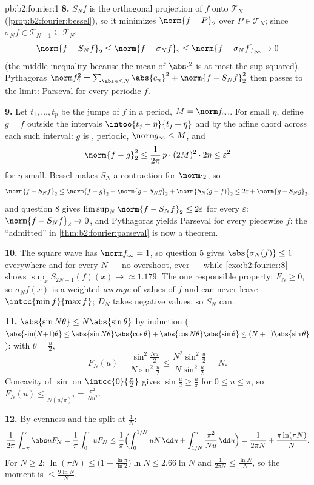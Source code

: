 \begin{solution}{pb:b2:fourier:1}
\textbf{8.} $S_Nf$ is the orthogonal projection of $f$ onto
$\mathcal T_N$ (\cref{prop:b2:fourier:bessel}), so it minimizes
$\norm{f - P}_2$ over $P \in \mathcal T_N$; since $\sigma_Nf
\in \mathcal T_{N-1} \subseteq \mathcal T_N$:
\[
\norm{f - S_Nf}_2 \leq \norm{f - \sigma_Nf}_2
\leq \norm{f - \sigma_Nf}_\infty \to 0
\]
(the middle inequality because the mean of $\abs\cdot^2$ is at
most the sup squared). Pythagoras $\norm f_2^2 = \sum_{\abs
n\leq N}\abs{c_n}^2 + \norm{f - S_Nf}_2^2$ then passes to the
limit: Parseval for every  periodic $f$.

\textbf{9.} Let $t_1, \dots, t_p$ be the jumps of $f$ in a
period, $M = \norm f_\infty$. For small $\eta$, define $g = f$
outside the intervals $\intoo{t_j - \eta}{t_j + \eta}$ and by
the affine chord across each such interval: $g$ is ,
periodic, $\norm g_\infty \leq M$, and
\[
\norm{f - g}_2^2 \leq \frac{1}{2\pi}\,p\cdot(2M)^2\cdot2\eta
\leq \varepsilon^2
\]
for $\eta$ small. Bessel makes $S_N$ a contraction for
$\norm\cdot_2$, so
\[
\norm{f - S_Nf}_2
\leq \norm{f - g}_2 + \norm{g - S_Ng}_2 + \norm{S_N(g -
f)}_2
\leq 2\varepsilon + \norm{g - S_Ng}_2 ,
\]
and question 8 gives $\limsup_N\norm{f - S_Nf}_2 \leq
2\varepsilon$ for every $\varepsilon$: $\norm{f - S_Nf}_2 \to
0$, and Pythagoras yields Parseval for every piecewise
 $f$: the ``admitted'' in
\cref{thm:b2:fourier:parseval} is now a theorem.

\textbf{10.} The square wave has $\norm f_\infty = 1$, so
question 5 gives $\abs{\sigma_N(f)} \leq 1$ everywhere and for
every $N$ --- no overshoot, ever --- while
\cref{exo:b2:fourier:8} shows $\sup_xS_{2N-1}(f)(x) \to
\approx 1.179$. The one responsible property: $F_N \geq 0$, so
$\sigma_Nf(x)$ is a weighted \emph{average} of values of $f$
and can never leave $\intcc{\min f}{\max f}$; $D_N$ takes
negative values, so $S_N$ can.

\textbf{11.} $\abs{\sin N\theta} \leq N\abs{\sin\theta}$ by
induction ($\abs{\sin(N{+}1)\theta} \leq
\abs{\sin N\theta}\abs{\cos\theta} +
\abs{\cos N\theta}\abs{\sin\theta} \leq
(N+1)\abs{\sin\theta}$): with $\theta = \frac u2$,
\[
F_N(u) = \frac{\sin^2\frac{Nu}2}{N\sin^2\frac u2}
\leq \frac{N^2\sin^2\frac u2}{N\sin^2\frac u2} = N .
\]
Concavity of $\sin$ on $\intcc{0}{\frac\pi2}$ gives
$\sin\frac u2 \geq \frac{u}{\pi}$ for $0 \leq u \leq \pi$, so
$F_N(u) \leq \frac{1}{N(u/\pi)^2} = \frac{\pi^2}{Nu^2}$.

\textbf{12.} By evenness and the split at $\frac1N$:
\[
\frac{1}{2\pi}\int_{-\pi}^{\pi}\abs uF_N
= \frac1\pi\int_0^\pi uF_N
\leq \frac1\pi\Bigl(\int_0^{1/N}uN\,\dd u +
\int_{1/N}^{\pi}\frac{\pi^2}{Nu}\,\dd u\Bigr)
= \frac{1}{2\pi N} + \frac{\pi\ln(\pi N)}{N} .
\]
For $N \geq 2$: $\ln(\pi N) \leq \bigl(1 +
\frac{\ln\pi}{\ln2}\bigr)\ln N \leq 2.66\ln N$ and
$\frac{1}{2\pi N} \leq \frac{\ln N}{N}$, so the moment is
$\leq \frac{9\ln N}{N}$.


\end{solution}
